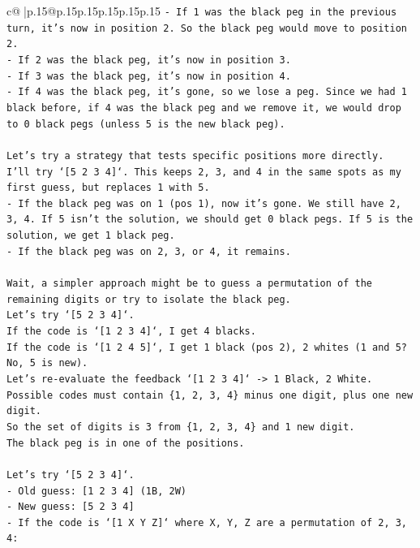 \documentclass{article}
\begin{document}
{\begin{supertabular}{c@{$\;$}|p{.15\linewidth}@{}p{.15\linewidth}p{.15\linewidth}p{.15\linewidth}p{.15\linewidth}p{.15\linewidth}}
{{{\texttt{{-} If 1 was the black peg in the previous turn, it's now in position 2. So the black peg would move to position 2.} \\
\texttt{{-} If 2 was the black peg, it's now in position 3.} \\
\texttt{{-} If 3 was the black peg, it's now in position 4.} \\
\texttt{{-} If 4 was the black peg, it's gone, so we lose a peg. Since we had 1 black before, if 4 was the black peg and we remove it, we would drop to 0 black pegs (unless 5 is the new black peg).} \\
\\ 
\texttt{Let's try a strategy that tests specific positions more directly.} \\
\texttt{I'll try `{[}5 2 3 4{]}`. This keeps 2, 3, and 4 in the same spots as my first guess, but replaces 1 with 5.} \\
\texttt{{-} If the black peg was on 1 (pos 1), now it's gone. We still have 2, 3, 4. If 5 isn't the solution, we should get 0 black pegs. If 5 is the solution, we get 1 black peg.} \\
\texttt{{-} If the black peg was on 2, 3, or 4, it remains.} \\
\\ 
\texttt{Wait, a simpler approach might be to guess a permutation of the remaining digits or try to isolate the black peg.} \\
\texttt{Let's try `{[}5 2 3 4{]}`.} \\
\texttt{If the code is `{[}1 2 3 4{]}`, I get 4 blacks.} \\
\texttt{If the code is `{[}1 2 4 5{]}`, I get 1 black (pos 2), 2 whites (1 and 5? No, 5 is new).} \\
\texttt{Let's re{-}evaluate the feedback `{[}1 2 3 4{]}` {-}> 1 Black, 2 White.} \\
\texttt{Possible codes must contain \{1, 2, 3, 4\} minus one digit, plus one new digit.} \\
\texttt{So the set of digits is 3 from \{1, 2, 3, 4\} and 1 new digit.} \\
\texttt{The black peg is in one of the positions.} \\
\\ 
\texttt{Let's try `{[}5 2 3 4{]}`.} \\
\texttt{{-} Old guess: {[}1 2 3 4{]} (1B, 2W)} \\
\texttt{{-} New guess: {[}5 2 3 4{]}} \\
\texttt{{-} If the code is `{[}1 X Y Z{]}` where X, Y, Z are a permutation of 2, 3, 4:} \\
}}}
\end{supertabular}}
\end{document}
